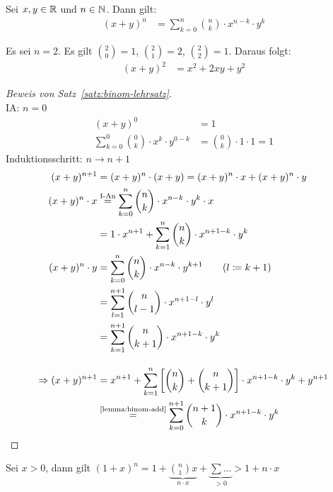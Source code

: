 \begin{satz}
    \label{satz:binom-lehrsatz}
    Sei $x,y\in\mathbb{R}$ und $n\in\mathbb{N}$. Dann gilt:
    \begin{align*}
    (x+y)
        ^{n} &= \sum_{k=0}^{n} \binom{n}{k}\cdot x^{n-k}\cdot y^k
    \end{align*}
\end{satz}
\begin{beispiel}
    Es sei $n=2$. Es gilt $\binom{2}{0}=1$, $\binom{2}{1}=2$, $\binom{2}{2}=1$. Daraus folgt:
    \begin{align*}
    (x+y)
        ^{2} &= x^2+2xy+y^2
    \end{align*}
\end{beispiel}
\begin{proof}[Beweis von Satz~\ref{satz:binom-lehrsatz}]
    ~\\IA: $n=0$
    \begin{align*}
    (x+y)
        ^0&=1\\
        \sum_{k=0}^0\binom{0}{k}\cdot x^{k}\cdot y^{0-k} &= \binom{0}{k}\cdot 1\cdot 1 = 1
    \end{align*}
    Induktionsschritt: $n\rightarrow n+1$
    \begin{align*}
    (x+y)
        ^{n+1} &= (x+y)^n\cdot (x+y) = (x+y)^n \cdot x + (x+y)^n\cdot y\\
        (x+y)^n\cdot x &\annot{=}{I-An} \sum_{k=0}^{n}\binom{n}{k}\cdot x^{n-k}\cdot y^k\cdot x\\
        &=1\cdot x^{n+1} + \sum_{k=1}^{n} \binom{n}{k}\cdot x^{n+1-k}\cdot y^{k}\\
        (x+y)^n\cdot y &= \sum_{k=0}^{n}\binom{n}{k}\cdot x^{n-k}\cdot y^{k+1}\tag{$l\definedas k+1$}\\
        &= \sum_{l=1}^{n+1} \binom{n}{l-1}\cdot x^{n+1-l}\cdot y^{l}\\
        &= \sum_{k=1}^{n+1} \binom{n}{k+1}\cdot x^{n+1-k} \cdot y^{k}\\[10pt]
        \impl (x+y)^{n+1} &= x^{n+1} + \sum_{k=1}^{n} \interv{\binom{n}{k}+\binom{n}{k+1}} \cdot x^{n+1-k}\cdot y^k + y^{n+1}\\
        &\annot{=}{\ref{lemma:binom-add}} \sum_{k=0}^{n+1} \binom{n+1}{k}\cdot x^{n+1-k}\cdot y^{k}\qedhere
    \end{align*}
\end{proof}

\begin{bemerkung}
    Sei $x>0$, dann gilt $(1+x)^n = 1+\underbrace{\binom{n}{1}x}_{n\cdot x} + \underbrace{\sum \dots}_{>0} > 1 + n\cdot x$
\end{bemerkung}

